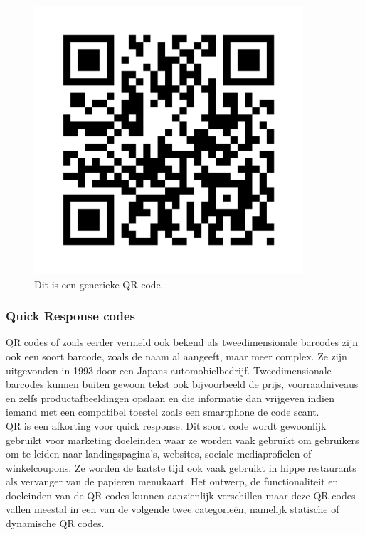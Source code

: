 \begin{figure}
    \includegraphics[width=10cm, height=10cm]{QRCode.png}
    \caption[QR Code]{Dit is een generieke QR code.}
    \label{fig:qr}
\end{figure}

\subsubsection{Quick Response codes}
QR codes of zoals eerder vermeld ook bekend als tweedimensionale barcodes zijn ook een soort barcode, zoals de naam al aangeeft, maar meer complex. Ze zijn uitgevonden in 1993 door een Japans automobielbedrijf. Tweedimensionale barcodes kunnen buiten gewoon tekst ook bijvoorbeeld de prijs, voorraadniveaus en zelfs productafbeeldingen opslaan en die informatie dan vrijgeven indien iemand met een compatibel toestel zoals een smartphone de code scant.\\

QR is een afkorting voor quick response. Dit soort code wordt gewoonlijk gebruikt voor marketing doeleinden \autocite{Rodrigue2022} waar ze worden vaak gebruikt om gebruikers om te leiden naar landingspagina's, websites, sociale-mediaprofielen of winkelcoupons. Ze worden de laatste tijd ook vaak gebruikt in hippe restaurants als vervanger van de papieren menukaart. Het ontwerp, de functionaliteit en doeleinden van de QR codes kunnen aanzienlijk verschillen maar deze QR codes vallen meestal in een van de volgende twee categorieën, namelijk statische of dynamische QR codes. \\

